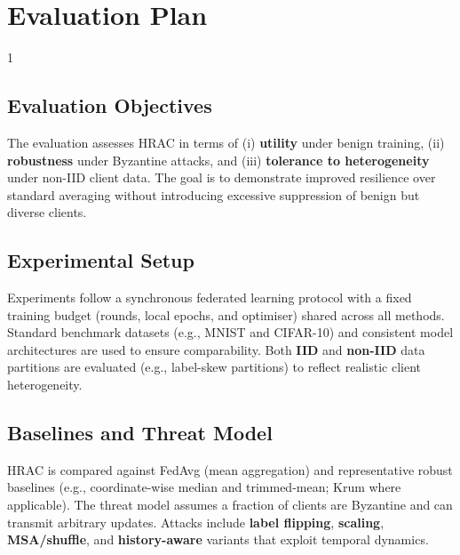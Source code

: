 \doublespacing %

\chapter{Evaluation Plan}
\label{chEval}

\begin{spacing}{1} %
\minitoc %
\end{spacing} %
\thesisspacing %

\section{Evaluation Objectives}

The evaluation assesses HRAC in terms of (i) \textbf{utility} under benign training, (ii) \textbf{robustness} under Byzantine attacks, and (iii) \textbf{tolerance to heterogeneity} under non-IID client data. The goal is to demonstrate improved resilience over standard averaging without introducing excessive suppression of benign but diverse clients.

\section{Experimental Setup}
Experiments follow a synchronous federated learning protocol with a fixed training budget (rounds, local epochs, and optimiser) shared across all methods. Standard benchmark datasets (e.g., MNIST and CIFAR-10) and consistent model architectures are used to ensure comparability. Both \textbf{IID} and \textbf{non-IID} data partitions are evaluated (e.g., label-skew partitions) to reflect realistic client heterogeneity.

\section{Baselines and Threat Model}

HRAC is compared against FedAvg (mean aggregation) and representative robust baselines (e.g., coordinate-wise median and trimmed-mean; Krum where applicable). The threat model assumes a fraction of clients are Byzantine and can transmit arbitrary updates. Attacks include \textbf{label flipping}, \textbf{scaling}, \textbf{MSA/shuffle}, and \textbf{history-aware} variants that exploit temporal dynamics.


